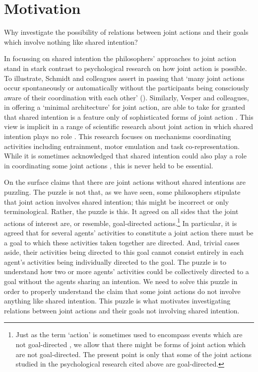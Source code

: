 \documentclass[12pt,a4paper]{extarticle}
\begin{document}
\section{Motivation}
Why investigate the possibility of relations between joint actions and their goals which involve nothing like shared intention?
  
In focussing on shared intention the philosophers' approaches to joint action stand in stark contrast to psychological research on how joint action is possible.
To illustrate, Schmidt and colleagues assert in passing that `many joint actions occur spontaneously or automatically without the participants being consciously aware of their coordination with each other' (\citeyear[p. 7]{schmidt_understanding_2010}).
Similarly, Vesper and colleagues, in offering a `minimal architecture' for joint action, are able to take for granted that shared intention is a feature only of sophisticated forms of joint action \citep{vesper_minimal_2010}.
This view is implicit in a range of scientific research about joint action in which shared intention plays no role 
	\citep[as reviewed in][]{%
		Knoblich:2010fk,
		Sebanz:2006yq%
	}.
This research focuses on mechanisms coordinating activities including entrainment, motor emulation and task co-representation.  
While it is sometimes acknowledged that shared intention could also play a role in coordinating some joint actions \citep[e.g.][]{Knoblich:2008hy}, this is never held to be essential.

On the surface claims that there are joint actions without shared intentions are puzzling.  
The puzzle is not that, as we have seen, some philosophers stipulate that joint action involves shared intention; this might be incorrect or  only terminological.
Rather, the puzzle is this.
It agreed on all sides that the joint actions of interest are, or resemble, goal-directed actions.\footnote{
Just as the term `action' is sometimes used to encompass events which are not goal-directed \citep[e.g.][]{Hursthouse:1991rd}, 
we allow that there might be forms of joint action which are not goal-directed.
The present point is only that some of the joint actions studied in the psychological research cited above are goal-directed.
}
In particular, it is agreed that for several agents' activities to constitute a joint action there must be a goal to which these activities taken together are directed.
And, trivial cases aside, their activities being directed to this goal cannot consist entirely in each agent's activities being individually directed to the goal.
The puzzle is to understand how two or more agents' activities could be collectively directed to a goal without the agents sharing an intention.
We need to solve this puzzle in order to properly understand the claim that some joint actions do not involve anything like shared intention.  
This puzzle is what motivates investigating relations between joint actions and their goals not involving shared intention.
\end{document}

